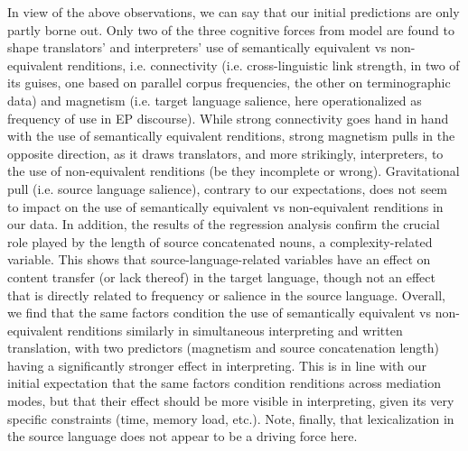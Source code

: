 \documentclass[output=paper]{langscibook}
\begin{document}
In view of the above observations, we can say that our initial predictions are only partly borne out. Only two of the three cognitive forces from  model are found to shape translators’ and interpreters’ use of semantically equivalent vs non-equivalent renditions, i.e. connectivity (i.e. cross-linguistic link strength, in two of its guises, one based on parallel corpus frequencies, the other on terminographic data) and magnetism (i.e. target language salience, here operationalized as frequency of use in EP discourse). While strong connectivity goes hand in hand with the use of semantically equivalent renditions, strong magnetism pulls in the opposite direction, as it draws translators, and more strikingly, interpreters, to the use of non-equivalent renditions (be they incomplete or wrong). Gravitational pull (i.e. source language salience), contrary to our expectations, does not seem to impact on the use of semantically equivalent vs non-equivalent renditions in our data. In addition, the results of the regression analysis confirm the crucial role played by the length of source concatenated nouns, a complexity-related variable. This shows that source-language-related variables have an effect on content transfer (or lack thereof) in the target language, though not an effect that is directly related to frequency or salience in the source language. Overall, we find that the same factors condition the use of semantically equivalent vs non-equivalent renditions similarly in simultaneous interpreting and written translation, with two predictors (magnetism and source concatenation length) having a significantly stronger effect in interpreting. This is in line with our initial expectation that the same factors condition renditions across mediation modes, but that their effect should be more visible in interpreting, given its very specific constraints (time, memory load, etc.). Note, finally, that lexicalization in the source language does not appear to be a driving force here. 
\end{document}
